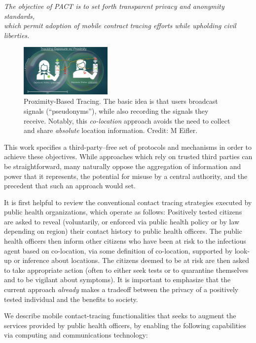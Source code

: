 \documentclass{article}
\begin{document}
\begin{center}
\emph{The objective of PACT is to set forth transparent privacy and
  anonymity standards,\\
  which permit adoption of mobile contract tracing efforts while upholding civil liberties.}
\end{center}

\begin{figure}
\centering
\includegraphics[width=0.4\textwidth]{fig_bubble}
\caption{\label{fig:bubble} Proximity-Based Tracing. The basic idea is that users broadcast signals (``pseudonyms''), while also recording the signals they receive. Notably, this \emph{co-location} approach
avoids the need to collect and share \emph{absolute} location information.
Credit: M Eifler.}
\end{figure}

This work specifies a third-party--free set of protocols and mechanisms in order to achieve these objectives. While approaches which rely on trusted third parties can be straightforward, many naturally oppose the aggregation of information and power that it represents, the potential for misuse by a central authority, and the precedent that such an approach would set.

It is first helpful to review the conventional contact tracing strategies executed by public health organizations, which operate as follows: Positively tested citizens are asked to reveal (voluntarily, or enforced via public health policy or by law depending on region) their contact history to public health officers. The public health officers then inform other citizens who have been at risk to the infectious agent based on co-location, via some definition of co-location, supported by look-up or inference about locations. The citizens deemed to be at risk are then asked to take appropriate action (often to either seek tests or to quarantine
themselves and to be vigilant about symptoms).  It is important to emphasize that the current approach \emph{already} makes a tradeoff between the privacy of a positively tested individual and the benefits to society.


We describe mobile contact-tracing functionalities that seeks to augment the services provided by public health officers, by enabling the following capabilities via computing and communications technology:
\end{document}
